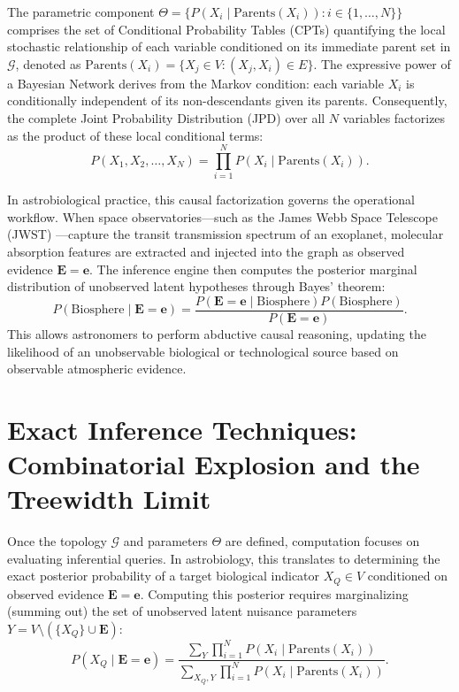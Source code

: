 The parametric component $\Theta = \{P(X_i \mid \mathrm{Parents}(X_i)) : i \in \{1, \dots, N\}\}$ comprises the set of Conditional Probability Tables (CPTs) quantifying the local stochastic relationship of each variable conditioned on its immediate parent set in $\mathcal{G}$, denoted as $\mathrm{Parents}(X_i) = \{X_j \in V : (X_j, X_i) \in E\}$. The expressive power of a Bayesian Network derives from the Markov condition: each variable $X_i$ is conditionally independent of its non-descendants given its parents. Consequently, the complete Joint Probability Distribution (JPD) over all $N$ variables factorizes as the product of these local conditional terms:
\begin{equation}
P(X_1, X_2, \dots, X_N) = \prod_{i=1}^N P\left(X_i \mid \mathrm{Parents}(X_i)\right).
\label{eq:jpd_factorization_ch2}
\end{equation}

In astrobiological practice, this causal factorization governs the operational workflow. When space observatories---such as the James Webb Space Telescope (JWST) \cite{madhusudhan2023}---capture the transit transmission spectrum of an exoplanet, molecular absorption features are extracted and injected into the graph as observed evidence $\mathbf{E} = \mathbf{e}$. The inference engine then computes the posterior marginal distribution of unobserved latent hypotheses through Bayes' theorem:
\begin{equation}
P(\mathrm{Biosphere} \mid \mathbf{E} = \mathbf{e}) = \frac{P(\mathbf{E} = \mathbf{e} \mid \mathrm{Biosphere}) P(\mathrm{Biosphere})}{P(\mathbf{E} = \mathbf{e})}.
\label{eq:bayes_theorem_inversion}
\end{equation}
This allows astronomers to perform abductive causal reasoning, updating the likelihood of an unobservable biological or technological source based on observable atmospheric evidence.

\section{Exact Inference Techniques: Combinatorial Explosion and the Treewidth Limit}\label{sec:exact_inference_treewidth}

Once the topology $\mathcal{G}$ and parameters $\Theta$ are defined, computation focuses on evaluating inferential queries. In astrobiology, this translates to determining the exact posterior probability of a target biological indicator $X_Q \in V$ conditioned on observed evidence $\mathbf{E} = \mathbf{e}$. Computing this posterior requires marginalizing (summing out) the set of unobserved latent nuisance parameters $Y = V \setminus (\{X_Q\} \cup \mathbf{E})$:
\begin{equation}
P(X_Q \mid \mathbf{E} = \mathbf{e}) = \frac{\sum_{Y} \prod_{i=1}^N P\left(X_i \mid \mathrm{Parents}(X_i)\right)}{\sum_{X_Q, Y} \prod_{i=1}^N P\left(X_i \mid \mathrm{Parents}(X_i)\right)}.
\label{eq:exact_marginal_query_ch2}
\end{equation}

